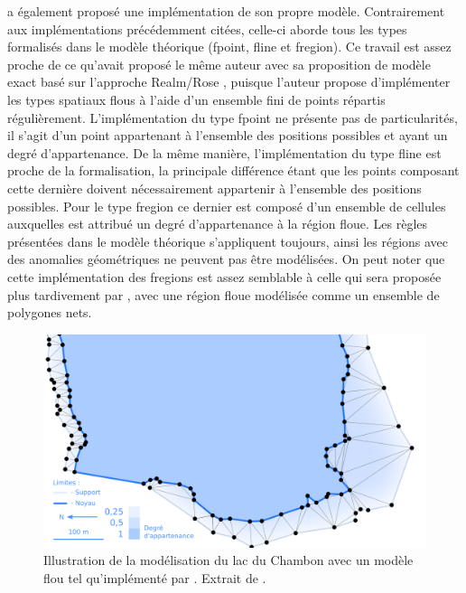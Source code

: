 \textcite{Schneider2003} a également proposé une implémentation de son
propre modèle. Contrairement aux implémentations précédemment citées,
celle-ci aborde tous les types formalisés dans le modèle théorique
(fpoint, fline et fregion). Ce travail est assez proche de ce qu’avait
proposé le même auteur avec sa proposition de modèle exact basé sur
l’approche Realm/Rose \textcite{Schneider1996}, puisque l’auteur
propose d’implémenter les types spatiaux flous à l’aide d’un ensemble
fini de points répartis régulièrement. L’implémentation du type fpoint
ne présente pas de particularités, il s’agit d’un point appartenant à
l’ensemble des positions possibles et ayant un degré
d’appartenance. De la même manière, l’implémentation du type fline est
proche de la formalisation, la principale différence étant que les
points composant cette dernière doivent nécessairement appartenir à
l’ensemble des positions possibles. Pour le type fregion ce dernier
est composé d’un ensemble de cellules auxquelles est attribué un degré
d’appartenance à la région floue. Les règles présentées dans le modèle
théorique s’appliquent toujours, ainsi les régions avec des anomalies
géométriques ne peuvent pas être modélisées. On peut noter que cette
implémentation des fregions est assez semblable à celle qui sera
proposée plus tardivement par \textcite{Kanjilal2010}, avec une région
floue modélisée comme un ensemble de polygones nets.

\begin{figure}
  \centering
  \includegraphics{../figures/fig10.png}
  \caption{Illustration de la modélisation du lac du Chambon avec un
    modèle flou tel qu’implémenté par \textcite{Dilo2007}. Extrait de
    \textcite{Bunel2020}.}
  \label{fig:champ_dilo}
\end{figure}

